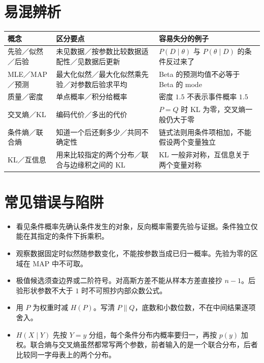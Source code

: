 \documentclass[UTF8,a4paper,zihao=-4,fontset=fandol]{ctexrep}
\begin{document}
\section{易混辨析}
\noindent\begin{tabularx}{\linewidth}{@{}p{.23\linewidth}XX@{}}
\toprule
概念 & 区分要点 & 容易失分的例子\\
\midrule
先验／似然／后验 & 未见数据／按参数比较数据适配性／见数据后更新 & \(P(D\mid\theta)\) 与 \(P(\theta\mid D)\) 的条件反过来了\\
MLE／MAP／预测 & 最大化似然／最大化似然乘先验／对参数后验求平均 & Beta 的预测均值不必等于 Beta 的 mode\\
质量／密度 & 单点概率／积分给概率 & 密度 \(1.5\) 不表示事件概率 \(1.5\)\\
交叉熵／KL & 编码代价／多出的代价 & \(P=Q\) 时 KL 为零，交叉熵一般仍大于零\\
条件熵／联合熵 & 知道一个后还剩多少／共同不确定性 & 链式法则用条件项相加，不能假设两个变量独立\\
KL／互信息 & 用来比较指定的两个分布／联合与边缘积之间的 KL & KL 一般非对称，互信息关于两个变量对称\\
\bottomrule
\end{tabularx}

\section{常见错误与陷阱}
\begin{itemize}[leftmargin=2em]
\item 看见条件概率先确认条件发生的对象，反向概率需要先验与证据。条件独立仅能在其指定的条件下拆乘积。
\item 观察数据固定时似然随参数变化，不能按参数当成已归一概率。先验为零的区域在 MAP 中不可取。
\item 极值候选须查边界或二阶符号。对高斯方差不能从样本方差直接抄 \(n-1\)。后验形状参数不大于 \(1\) 时不可照抄内部众数公式。
\item 用 \(P\) 为权重时减 \(H(P)\)。写清 \(P\|Q\)，底数和小数位数，不在中间结果逐项舍入。
\item \(H(X\mid Y)\) 先按 \(Y=y\) 分组，每个条件分布内概率要归一，再按 \(p(y)\) 加权。联合熵与交叉熵虽然都常写两个参数，前者输入的是一个联合分布，后者比较同一字母表上的两个分布。
\end{itemize}
\end{document}
